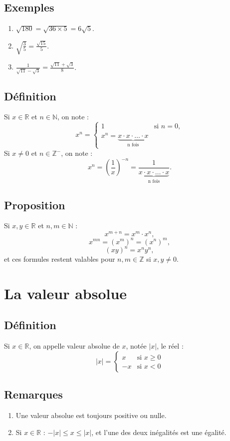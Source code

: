\documentclass{article}
\begin{document}
	\subsection{Exemples}
	\begin{enumerate}
		\item $\sqrt{180} = \sqrt{36 \times 5}  = 6\sqrt{5}$.
		\item $\sqrt{\frac{3}{5}} = \frac{\sqrt{15}}{5} $.
		\item $\frac{1}{\sqrt{11} - \sqrt{3}} =\frac{\sqrt{11} + \sqrt{3}}{8}  $.
	\end{enumerate}

	
	\subsection{Définition }
	Si $x \in \mathbb{R}$ et $n \in \mathbb{N}$, on note :
	\[ x^n =
	\begin{cases}
		1 & \text{si } n = 0, \\
	 x^n = \underbrace{x \cdot x \cdot \ldots \cdot x}_{\text{n fois}}
	
	\end{cases}
	\]
	Si $x \neq 0$ et $n \in \mathbb{Z}^{-}$, on note :
	\[ x^n =
	\left(\frac{1}{x}\right)^{-n} = \frac{1}{\underbrace{x \cdot x \cdot \ldots \cdot x}_{\text{n fois}} 
	}.
	\]
	
	\subsection{Proposition }
	Si $x, y \in \mathbb{R}$ et $n, m \in \mathbb{N}$ :
	\[ x^{m + n} = x^m \cdot x^n, \]
	\[ x^{mn} = (x^m)^n = (x^n)^m, \]
	\[ (xy)^n = x^n y^n, \]
	et ces formules restent valables pour $n, m \in \mathbb{Z}$ si $x, y \neq 0$.
	\section{La valeur absolue}
	
	\subsection{Définition }
	Si $x \in \mathbb{R}$, on appelle valeur absolue de $x$, notée $|x|$, le réel :
	\[
	|x| =
	\begin{cases}
		x & \text{si } x \geq 0 \\
		-x & \text{si } x < 0
	\end{cases}
	\]
	
	\subsection{Remarques }
	\begin{enumerate}
		\item Une valeur absolue est toujours positive ou nulle.
		\item Si $x \in \mathbb{R}$ : $-|x| \leq x \leq |x|$, et l'une des deux inégalités est une égalité.
	\end{enumerate}
	
\end{document}
